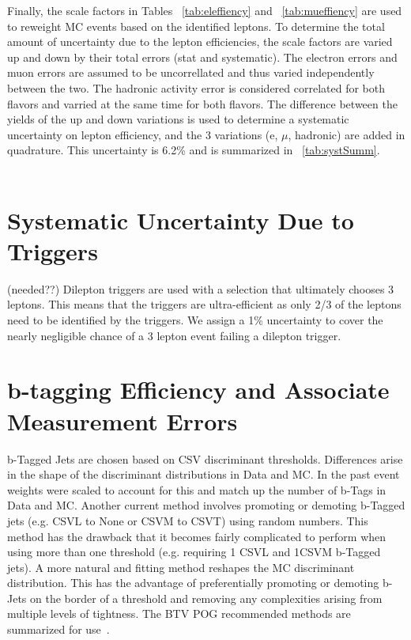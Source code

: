 Finally, the scale factors in Tables ~\ref{tab:eleffiency} and ~\ref{tab:mueffiency} are used to reweight MC events based on the identified leptons. To determine the total amount of uncertainty due to the lepton efficiencies, the scale factors are varied up and down by their total errors (stat and systematic). The electron errors and muon errors are assumed to be uncorrellated and thus varied independently between the two. The hadronic activity error is considered correlated for both flavors and varried at the same time for both flavors. The difference between the yields of the up and down variations is used to determine a systematic uncertainty on lepton efficiency, and the 3 variations (e, $\mu$, hadronic) are added in quadrature. This uncertainty is 6.2\% and is summarized in ~\ref{tab:systSumm}.\\\\





\section{Systematic Uncertainty Due to Triggers}         (needed??)
\label{sec:trigger_syst}
Dilepton triggers are used with a selection that ultimately chooses 3 leptons. This means that the triggers are ultra-efficient as only 2/3 of the leptons need to be identified by the triggers. We assign a 1\% uncertainty to cover the nearly negligible chance of a 3 lepton event failing a dilepton trigger.

\section{b-tagging Efficiency and Associate Measurement Errors}
\label{sec:btag_syst}
b-Tagged Jets are chosen based on CSV discriminant thresholds. Differences arise in the shape of the discriminant distributions in Data and MC. In the past event weights were scaled to account for this and match up the number of b-Tags in Data and MC. Another current method involves promoting or demoting b-Tagged jets (e.g. CSVL to None or CSVM to CSVT) using random numbers. This method has the drawback that it becomes fairly complicated to perform when using more than one threshold (e.g. requiring 1 CSVL and 1CSVM b-Tagged jets). A more natural and fitting method reshapes the MC discriminant distribution. This has the advantage of preferentially promoting or demoting b-Jets on the border of a threshold and removing any complexities arising from multiple levels of tightness. The BTV POG recommended methods are summarized for use~\cite{bTagSF}.\\

